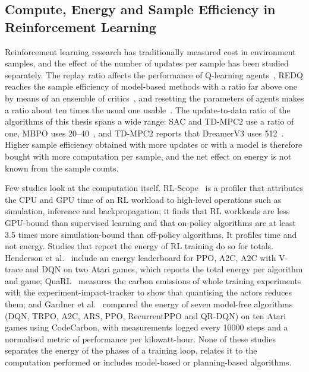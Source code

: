 \subsection{Compute, Energy and Sample Efficiency in Reinforcement Learning}\label{sec:related-rl-compute}

Reinforcement learning research has traditionally measured cost in environment samples, and the effect of the number of updates per sample has been studied separately.
The replay ratio affects the performance of Q-learning agents~\cite{fedus2020replay}, REDQ reaches the sample efficiency of model-based methods with a ratio far above one by means of an ensemble of critics~\cite{chen2021redq}, and resetting the parameters of agents makes a ratio about ten times the usual one usable~\cite{doro2023replayratio}.
The update-to-data ratio of the algorithms of this thesis spans a wide range: SAC and TD-MPC2 use a ratio of one, MBPO uses \numrange{20}{40}~\cite{chen2021redq}, and TD-MPC2 reports that DreamerV3 uses \num{512}~\cite{hansen2024tdmpc2}.
Higher sample efficiency obtained with more updates or with a model is therefore bought with more computation per sample, and the net effect on energy is not known from the sample counts.

Few studies look at the computation itself.
RL-Scope~\cite{gleeson2021rlscope} is a profiler that attributes the CPU and GPU time of an RL workload to high-level operations such as simulation, inference and backpropagation; it finds that RL workloads are less GPU-bound than supervised learning and that on-policy algorithms are at least \num{3.5} times more simulation-bound than off-policy algorithms.
It profiles time and not energy.
Studies that report the energy of RL training do so for totals.
Henderson et al.~\cite{henderson2020systematic} include an energy leaderboard for PPO, A2C, A2C with V-trace and DQN on two Atari games, which reports the total energy per algorithm and game; QuaRL~\cite{krishnan2022quarl} measures the carbon emissions of whole training experiments with the experiment-impact-tracker to show that quantising the actors reduces them; and Gardner et al.~\cite{gardner2025greener} compared the energy of seven model-free algorithms (DQN, TRPO, A2C, ARS, PPO, RecurrentPPO and QR-DQN) on ten Atari games using CodeCarbon, with measurements logged every \num{10000} steps and a normalised metric of performance per kilowatt-hour.
None of these studies separates the energy of the phases of a training loop, relates it to the computation performed or includes model-based or planning-based algorithms.

